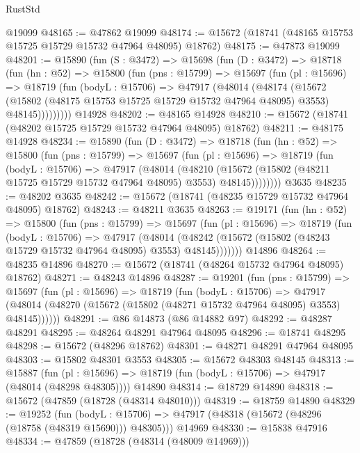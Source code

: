 \begin{lexlean}{RustStd}
\begin{coremodule}
    @19099
@48165 := @47862 @19099
@48174 := @15672 (@18741 (@48165 @15753 @15725 @15729 @15732 @47964 @48095) @18762)
@48175 := @47873 @19099
@48201 := @15890
    (fun (S : @3472) =>
    @15698
      (fun (D : @3472) =>
      @18718
        (fun (hn : @52) =>
        @15800
          (fun (pns : @15799) =>
          @15697
            (fun (pl : @15696) =>
            @18719
              (fun (bodyL : @15706) =>
              @47917
                (@48014
                  (@48174
                    (@15672
                      (@15802 (@48175 @15753 @15725 @15729 @15732 @47964 @48095) @3553)
                      @48145)))))))))
    @14928
@48202 := @48165 @14928
@48210 := @15672 (@18741 (@48202 @15725 @15729 @15732 @47964 @48095) @18762)
@48211 := @48175 @14928
@48234 := @15890
    (fun (D : @3472) =>
    @18718
      (fun (hn : @52) =>
      @15800
        (fun (pns : @15799) =>
        @15697
          (fun (pl : @15696) =>
          @18719
            (fun (bodyL : @15706) =>
            @47917
              (@48014
                (@48210
                  (@15672 (@15802 (@48211 @15725 @15729 @15732 @47964 @48095) @3553) @48145))))))))
    @3635
@48235 := @48202 @3635
@48242 := @15672 (@18741 (@48235 @15729 @15732 @47964 @48095) @18762)
@48243 := @48211 @3635
@48263 := @19171
    (fun (hn : @52) =>
    @15800
      (fun (pns : @15799) =>
      @15697
        (fun (pl : @15696) =>
        @18719
          (fun (bodyL : @15706) =>
          @47917
            (@48014
              (@48242 (@15672 (@15802 (@48243 @15729 @15732 @47964 @48095) @3553) @48145)))))))
    @14896
@48264 := @48235 @14896
@48270 := @15672 (@18741 (@48264 @15732 @47964 @48095) @18762)
@48271 := @48243 @14896
@48287 := @19201
    (fun (pns : @15799) =>
    @15697
      (fun (pl : @15696) =>
      @18719
        (fun (bodyL : @15706) =>
        @47917 (@48014 (@48270 (@15672 (@15802 (@48271 @15732 @47964 @48095) @3553) @48145))))))
@48291 := @86 @14873 (@86 @14882 @97)
@48292 := @48287 @48291
@48295 := @48264 @48291 @47964 @48095
@48296 := @18741 @48295
@48298 := @15672 (@48296 @18762)
@48301 := @48271 @48291 @47964 @48095
@48303 := @15802 @48301 @3553
@48305 := @15672 @48303 @48145
@48313 := @15887
    (fun (pl : @15696) => @18719 (fun (bodyL : @15706) => @47917 (@48014 (@48298 @48305))))
    @14890
@48314 := @18729 @14890
@48318 := @15672 (@47859 (@18728 (@48314 @48010)))
@48319 := @18759 @14890
@48329 := @19252
    (fun (bodyL : @15706) => @47917 (@48318 (@15672 (@48296 (@18758 (@48319 @15690))) @48305)))
    @14969
@48330 := @15838 @47916
@48334 := @47859 (@18728 (@48314 (@48009 @14969)))

\end{coremodule}
\end{lexlean}
